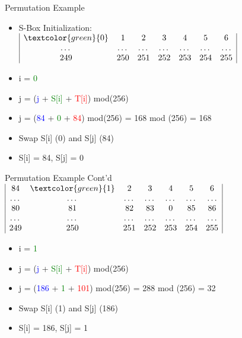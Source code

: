 \documentclass[
	aspectratio=169,	%
	onlytextwidth,		%
	t,					%
	]{beamer}
\begin{document}
\begin{frame}{Permutation Example}
	\begin{itemize}
		\item S-Box Initialization:
		\medskip
		$\begin{array}{|ccccccc|}
		\textcolor{green}{0} & 1 & 2 & 3 & 4 & 5 & 6 \\
		\dots & \dots & \dots & \dots & \dots & \dots & \dots \\
		249 & 250 & 251 & 252 & 253 & 254 & 255 \\
		\end{array}$
		\item i = \textcolor{green}{0}
		\item j = (\textcolor{blue} {j} + \textcolor{green}{S[i]} + \textcolor{red}{T[i]}) mod(256)
		\item j = (\textcolor{blue} {84} + \textcolor{green} {0} + \textcolor{red} {84}) mod(256) = 168 mod (256) = 168
		\item Swap S[i] (0) and S[j] (84)
		\item S[i] = 84, S[j] = 0
	\end{itemize}
\end{frame}

\begin{frame}{Permutation Example Cont'd}
	$\begin{array}{|ccccccc|}
		84 & \textcolor{green}{1} & 2 & 3 & 4 & 5 & 6 \\
		\dots & \dots & \dots & \dots & \dots & \dots & \dots \\
		80 & 81 & 82 & 83 & 0 & 85 & 86 \\
		\dots & \dots & \dots & \dots & \dots & \dots & \dots \\
		249 & 250 & 251 & 252 & 253 & 254 & 255 \\
	\end{array}$
	\begin{itemize}
		\item i = \textcolor{green}{1}
		\item j = (\textcolor{blue} {j} + \textcolor{green}{S[i]} + \textcolor{red}{T[i]}) mod(256)
		\item j = (\textcolor{blue} {186} + \textcolor{green} {1} + \textcolor{red} {101}) mod(256) = 288 mod (256) = 32
		\item Swap S[i] (1) and S[j] (186)
		\item S[i] = 186, S[j] = 1
	\end{itemize}
\end{frame}
\end{document}
